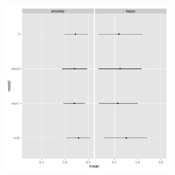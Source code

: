 \documentclass{article}\usepackage{graphicx, color}
\begin{document}
\begin{figure}[t]
\begin{subfigure}[b]{0.5\textwidth}
    \includegraphics[width = \textwidth]{figure/resamp2}
    \label{fig:resamp2}
  \end{subfigure}\\


\end{figure}
\end{document}
